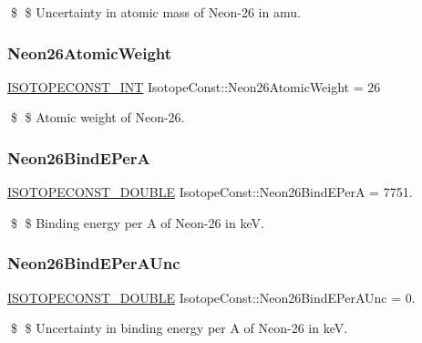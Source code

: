 \$ \$ Uncertainty in atomic mass of Neon-\/26 in amu. \mbox{\label{group___isotope_const-_neon-_ne26_ga286813b960167fd80d302d0dfb443df2}} 
\subsubsection{\texorpdfstring{Neon26\+Atomic\+Weight}{Neon26AtomicWeight}}
{\footnotesize\ttfamily \mbox{\hyperlink{group___isotope_const-_macros_ga5f18360b3e99483a35c32d789e62621c}{I\+S\+O\+T\+O\+P\+E\+C\+O\+N\+S\+T\+\_\+\+I\+NT}} Isotope\+Const\+::\+Neon26\+Atomic\+Weight = 26}

\$ \$ Atomic weight of Neon-\/26. \mbox{\label{group___isotope_const-_neon-_ne26_gaf8e988ccc4d2147314814a69253e586f}} 
\subsubsection{\texorpdfstring{Neon26\+Bind\+E\+PerA}{Neon26BindEPerA}}
{\footnotesize\ttfamily \mbox{\hyperlink{group___isotope_const-_macros_ga8f45a7272ce02c0b4c65c44636ed719a}{I\+S\+O\+T\+O\+P\+E\+C\+O\+N\+S\+T\+\_\+\+D\+O\+U\+B\+LE}} Isotope\+Const\+::\+Neon26\+Bind\+E\+PerA = 7751.}

\$ \$ Binding energy per A of Neon-\/26 in keV. \mbox{\label{group___isotope_const-_neon-_ne26_gaf80903ba7a34d8a8f3b053af07f36af5}} 
\subsubsection{\texorpdfstring{Neon26\+Bind\+E\+Per\+A\+Unc}{Neon26BindEPerAUnc}}
{\footnotesize\ttfamily \mbox{\hyperlink{group___isotope_const-_macros_ga8f45a7272ce02c0b4c65c44636ed719a}{I\+S\+O\+T\+O\+P\+E\+C\+O\+N\+S\+T\+\_\+\+D\+O\+U\+B\+LE}} Isotope\+Const\+::\+Neon26\+Bind\+E\+Per\+A\+Unc = 0.}

\$ \$ Uncertainty in binding energy per A of Neon-\/26 in keV. \mbox{\label{group___isotope_const-_neon-_ne26_gada2ded32714a05a701b9189ebb72b60b}} 

